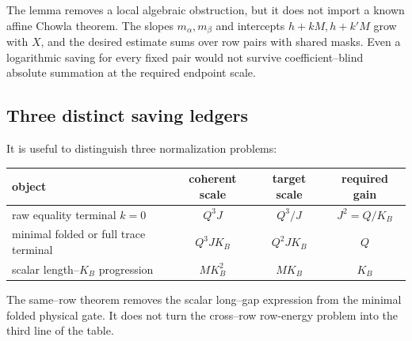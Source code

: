 The lemma removes a local algebraic obstruction, but it does not import a
known affine Chowla theorem.  The slopes \(m_\alpha,m_\beta\) and
intercepts \(h+kM,h+k'M\) grow with \(X\), and the desired estimate sums
over row pairs with shared masks.  Even a logarithmic saving for every
fixed pair would not survive coefficient--blind absolute summation at the
required endpoint scale.

\subsection{Three distinct saving ledgers}

It is useful to distinguish three normalization problems:
\begin{center}
\begin{tabular}{@{}p{}ccc@{}}
\toprule
object & coherent scale & target scale & required gain\\
\midrule
raw equality terminal \(k=0\)
 & \(Q^3J\) & \(Q^3/J\) & \(J^2=Q/K_B\)\\
minimal folded or full trace terminal
 & \(Q^3JK_B\) & \(Q^2JK_B\) & \(Q\)\\
scalar length--\(K_B\) progression
 & \(MK_B^2\) & \(MK_B\) & \(K_B\)\\
\bottomrule
\end{tabular}
\end{center}
The same--row theorem removes the scalar long--gap expression from the
minimal folded physical gate.  It does not turn the cross--row row-energy
problem into the third line of the table.
